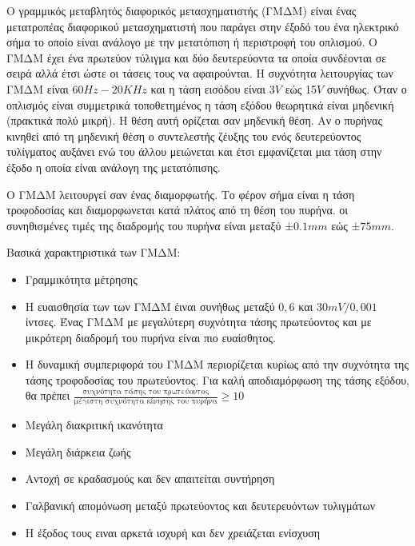 \documentclass{article}
\begin{document}
Ο γραμμικός μεταβλητός διαφορικός μετασχηματιστής (ΓΜΔΜ) είναι ένας μετατροπέας διαφορικού μετασχηματιστή που παράγει στην έξοδό του ένα ηλεκτρικό σήμα το οποίο είναι ανάλογο με την 
μετατόπιση ή περιστροφή του οπλισμού. Ο ΓΜΔΜ έχει ένα πρωτεύον τύλιγμα και δύο δευτερεύοντα τα οποία συνδέονται σε σειρά αλλά έτσι ώστε οι τάσεις τους να αφαιρούνται. Η συχνότητα 
λειτουργίας των ΓΜΔΜ είναι $60Hz-20KHz$ και η τάση εισόδου είναι 3$V$ εώς 15$V$ συνήθως. Όταν ο οπλισμός είναι συμμετρικά τοποθετημένος η τάση εξόδου θεωρητικά είναι μηδενική (πρακτικά
πολύ μικρή). Η θέση αυτή ορίζεται σαν μηδενική θέση. Αν ο πυρήνας κινηθεί από τη μηδενική θέση ο συντελεστής ζέυξης του ενός δευτερεύοντος τυλίγματος αυξάνει ενώ του άλλου 
μειώνεται και έτσι εμφανίζεται μια τάση στην έξοδο η οποία είναι ανάλογη της μετατόπισης.

O ΓΜΔΜ λειτουργεί σαν ένας διαμορφωτής. Το φέρον σήμα είναι η τάση τροφοδοσίας και διαμορφωνεται κατά πλάτος από τη θέση του πυρήνα. οι συνηθισμένες τιμές της διαδρομής του πυρήνα είναι
μεταξύ ±$0.1mm$ εώς ±$75mm$.

Βασικά χαρακτηριστικά των ΓΜΔΜ: 

\begin{itemize}
    \item Γραμμικότητα μέτρησης
    \item Η ευαισθησία των των ΓΜΔΜ έιναι συνήθως μεταξύ $0,6$ και $30mV/0,001$ ίντσες. Ένας ΓΜΔΜ με μεγαλύτερη συχνότητα τάσης πρωτεύοντος και με μικρότερη διαδρομή του πυρήνα είναι πιο ευαίσθητος.
    \item Η δυναμική συμπεριφορά του ΓΜΔΜ περιορίζεται κυρίως από την συχνότητα της τάσης τροφοδοσίας του πρωτεύοντος. Για καλή αποδιαμόρφωση της τάσης εξόδου, θα πρέπει
        \newline$\frac{\text{συχνότητα τάσης του πρωτεύοντος}}{\text{μέγιστη συχνότητα κίνησης του πυρήνα}}\geq 10$
    \item Μεγάλη διακριτική ικανότητα
    \item Μεγάλη διάρκεια ζωής
    \item Αντοχή σε κραδασμούς και δεν απαιτείται συντήρηση
    \item Γαλβανική απομόνωση μεταξύ πρωτεύοντος και δευτερευόντων τυλιγμάτων
    \item Η έξοδος τους ειναι αρκετά ισχυρή και δεν χρειάζεται ενίσχυση
\end{itemize}
\end{document}
